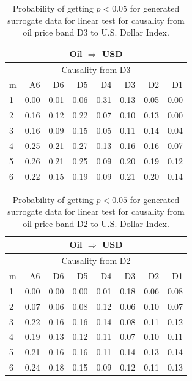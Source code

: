 %
%
\begin{table}[H]
\begin{center}
\begin{tabular}{l|r r r r r r r}
\hline\hline
\multicolumn{8}{c}{Oil $\Rightarrow$ USD}\\
\hline
\multicolumn{8}{c}{Causality from D3}\\
\hline\hline
m & A6 & D6 & D5 & D4 & D3 & D2 & D1 \\
\hline
1 & 0.00 & 0.01 & 0.06 & \cellcolor{mygrey}0.31 & 0.13 & 0.05 & 0.00 \\
2 & 0.16 & 0.12 & 0.22 & 0.07 & 0.10 & 0.13 & 0.00 \\
3 & 0.16 & 0.09 & 0.15 & 0.05 & 0.11 & 0.14 & 0.04 \\
4 & 0.25 & 0.21 & 0.27 & 0.13 & 0.16 & 0.16 & 0.07 \\
5 & 0.26 & 0.21 & 0.25 & 0.09 & \cellcolor{mygrey}0.20 & 0.19 & 0.12 \\
6 & 0.22 & 0.15 & 0.19 & 0.09 & \cellcolor{mygrey}0.21 & 0.20 & 0.14 \\
\hline\hline
\end{tabular}
\caption{Probability of getting $p < 0.05$ for generated surrogate data for linear test for causality from oil price band D3 to U.S. Dollar Index.}
\end{center}
\end{table}

%
%
\begin{table}[H]
\begin{center}
\begin{tabular}{l|r r r r r r r}
\hline\hline
\multicolumn{8}{c}{Oil $\Rightarrow$ USD}\\
\hline
\multicolumn{8}{c}{Causality from D2}\\
\hline\hline
m & A6 & D6 & D5 & D4 & D3 & D2 & D1 \\
\hline
1 & 0.00 & 0.00 & 0.00 & 0.01 & \cellcolor{mygrey}0.18 & 0.06 & 0.08 \\
2 & 0.07 & 0.06 & 0.08 & 0.12 & 0.06 & 0.10 & 0.07 \\
3 & 0.22 & 0.16 & 0.16 & 0.14 & 0.08 & 0.11 & 0.12 \\
4 & 0.19 & 0.13 & 0.12 & 0.11 & \cellcolor{mygrey}0.07 & 0.10 & 0.11 \\
5 & 0.21 & 0.16 & 0.16 & 0.11 & \cellcolor{mygrey}0.14 & 0.13 & 0.14 \\
6 & 0.24 & 0.18 & 0.15 & 0.09 & \cellcolor{mygrey}0.12 & 0.11 & 0.13 \\
\hline\hline
\end{tabular}
\caption{Probability of getting $p < 0.05$ for generated surrogate data for linear test for causality from oil price band D2 to U.S. Dollar Index.}
\end{center}
\end{table}


